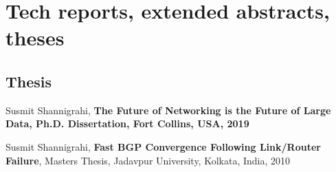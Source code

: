 \section{Tech reports, extended abstracts, theses}
\subsection{Thesis}
\begin{etaremune}

\item Susmit Shannigrahi, \textbf{The Future of Networking is the Future of Large Data, Ph.D. Dissertation, Fort Collins, USA, 2019}

\item Susmit Shannigrahi, \textbf{Fast BGP Convergence Following Link/Router Failure}, Masters Thesis, Jadavpur University, Kolkata, India, 2010
\end{etaremune}
